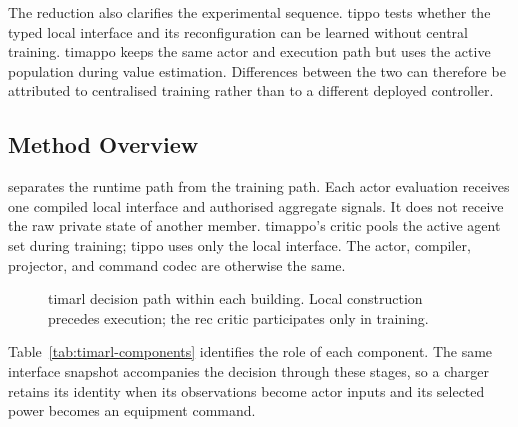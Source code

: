 The reduction also clarifies the experimental sequence. \gls{tippo} tests whether the typed local interface and its reconfiguration can be learned without central training. \gls{timappo} keeps the same actor and execution path but uses the active population during value estimation. Differences between the two can therefore be attributed to centralised training rather than to a different deployed controller.

\subsection{Method Overview}
\label{sec:timarl-architecture-overview}



 separates the runtime path from the training path. Each actor evaluation receives one compiled local interface and authorised aggregate signals. It does not receive the raw private state of another member. \gls{timappo}'s critic pools the active agent set during training; \gls{tippo} uses only the local interface. The actor, compiler, projector, and command codec are otherwise the same.

\begin{figure}[H]
\centering

\caption{\gls{timarl} decision path within each building. Local construction precedes execution; the \gls{rec} critic participates only in training.}
\label{fig:timarl-architecture}
\end{figure}

Table~\ref{tab:timarl-components} identifies the role of each component. The same interface snapshot accompanies the decision through these stages, so a charger retains its identity when its observations become actor inputs and its selected power becomes an equipment command.

